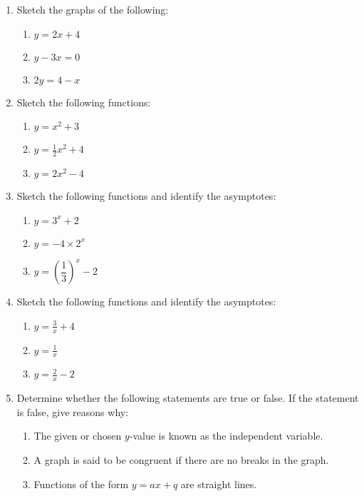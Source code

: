 \begin{eocexercises}{}
  \begin{enumerate}[itemsep=9pt, label=\textbf{\arabic*}. ] 
  \item Sketch the graphs of the following: 
    \begin{enumerate}[noitemsep, label=\textbf{(\alph*)} ]
    \item $y=2x+4$ 
    \item $y-3x=0$ 
    \item $2y=4-x$
    \end{enumerate}
  \item Sketch the following functions: 
    \begin{enumerate}[noitemsep, label=\textbf{(\alph*)} ] %
    \item $y=x^{2}+3$ 
    \item $y=\frac{1}{2}x^{2}+4$
    \item $y=2x^{2}-4$
    \end{enumerate}
  \item Sketch the following functions and identify the asymptotes: 
    \begin{enumerate}[noitemsep, label=\textbf{(\alph*)} ]  %
    \item $y=3^{x}+2$ 
    \item $y=-4 \times 2^{x}$ 
    \item $y=\left(\dfrac{1}{3}\right)^{x}-2$ 
    \end{enumerate}
  \item Sketch the following functions and identify the asymptotes: 
    \begin{enumerate}[noitemsep, label=\textbf{(\alph*)} ] %
    \item $y=\frac{3}{x}+4$ 
    \item $y=\frac{1}{x}$ 
    \item $y=\frac{2}{x}-2$ 
    \end{enumerate}
  \item Determine whether the following statements are true or false. If the statement is false, give reasons why:
    \begin{enumerate}[noitemsep, label=\textbf{(\alph*)} ] %
    \item The given or chosen $y$-value is known as the independent variable.
    \item A graph is said to be congruent if there are no breaks in the graph.
    \item Functions of the form $y=ax+q$ are straight lines.

\end{enumerate}
\end{enumerate}
\end{eocexercises}
